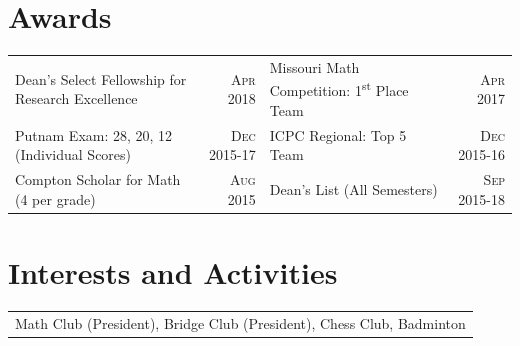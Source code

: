 \documentclass{article}
\begin{document}
\vspace{12pt}\section{Awards}
\begin{tabularx}{\textwidth}{Xr|Xr}
Dean's Select Fellowship for Research Excellence& \textsc{Apr} 2018 & Missouri Math Competition: 1\textsuperscript{st} Place Team & \textsc{Apr} 2017\\
Putnam Exam: 28, 20, 12 (Individual Scores) & \textsc{Dec} 2015-17 & ICPC Regional: Top 5 Team & \textsc{Dec} 2015-16 \\
Compton Scholar for Math (4 per grade)& \textsc{Aug} 2015 & Dean's List (All Semesters) & \textsc{Sep} 2015-18
\end{tabularx}


\vspace{12pt}\section{Interests and Activities}
\begin{tabularx}{\textwidth}{X}
Math Club (President), Bridge Club (President), Chess Club, Badminton
\end{tabularx}
\end{document}
